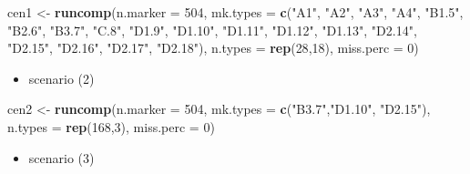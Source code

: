 \documentclass[]{article}
\newenvironment{Shaded}{\begin{snugshade}}{\end{snugshade}}
\newcommand{\DataTypeTok}[1]{\textcolor[rgb]{0.13,0.29,0.53}{#1}}
\newcommand{\DecValTok}[1]{\textcolor[rgb]{0.00,0.00,0.81}{#1}}
\newcommand{\KeywordTok}[1]{\textcolor[rgb]{0.13,0.29,0.53}{\textbf{#1}}}
\newcommand{\NormalTok}[1]{#1}
\newcommand{\StringTok}[1]{\textcolor[rgb]{0.31,0.60,0.02}{#1}}
\providecommand{\tightlist}{%
  \setlength{\itemsep}{0pt}\setlength{\parskip}{0pt}}
\begin{document}
\begin{Shaded}
\begin{Highlighting}[]
\NormalTok{cen1 <-}\StringTok{ }\KeywordTok{runcomp}\NormalTok{(}\DataTypeTok{n.marker =} \DecValTok{504}\NormalTok{, }
                \DataTypeTok{mk.types =} \KeywordTok{c}\NormalTok{(}\StringTok{"A1"}\NormalTok{, }\StringTok{"A2"}\NormalTok{, }\StringTok{"A3"}\NormalTok{, }\StringTok{"A4"}\NormalTok{, }\StringTok{"B1.5"}\NormalTok{, }\StringTok{"B2.6"}\NormalTok{, }\StringTok{"B3.7"}\NormalTok{,}
                             \StringTok{"C.8"}\NormalTok{, }\StringTok{"D1.9"}\NormalTok{, }\StringTok{"D1.10"}\NormalTok{, }\StringTok{"D1.11"}\NormalTok{, }\StringTok{"D1.12"}\NormalTok{, }\StringTok{"D1.13"}\NormalTok{,}
                             \StringTok{"D2.14"}\NormalTok{, }\StringTok{"D2.15"}\NormalTok{, }\StringTok{"D2.16"}\NormalTok{, }\StringTok{"D2.17"}\NormalTok{, }\StringTok{"D2.18"}\NormalTok{),}
                \DataTypeTok{n.types =} \KeywordTok{rep}\NormalTok{(}\DecValTok{28}\NormalTok{,}\DecValTok{18}\NormalTok{),}
                \DataTypeTok{miss.perc =} \DecValTok{0}\NormalTok{)}
\end{Highlighting}
\end{Shaded}

\begin{itemize}
\tightlist
\item
  scenario (2)
\end{itemize}

\begin{Shaded}
\begin{Highlighting}[]
\NormalTok{cen2 <-}\StringTok{ }\KeywordTok{runcomp}\NormalTok{(}\DataTypeTok{n.marker =} \DecValTok{504}\NormalTok{, }
                \DataTypeTok{mk.types =} \KeywordTok{c}\NormalTok{(}\StringTok{"B3.7"}\NormalTok{,}\StringTok{"D1.10"}\NormalTok{, }\StringTok{"D2.15"}\NormalTok{),}
                \DataTypeTok{n.types =} \KeywordTok{rep}\NormalTok{(}\DecValTok{168}\NormalTok{,}\DecValTok{3}\NormalTok{),}
                \DataTypeTok{miss.perc =} \DecValTok{0}\NormalTok{)}
\end{Highlighting}
\end{Shaded}

\begin{itemize}
\tightlist
\item
  scenario (3)
\end{itemize}
\end{document}
